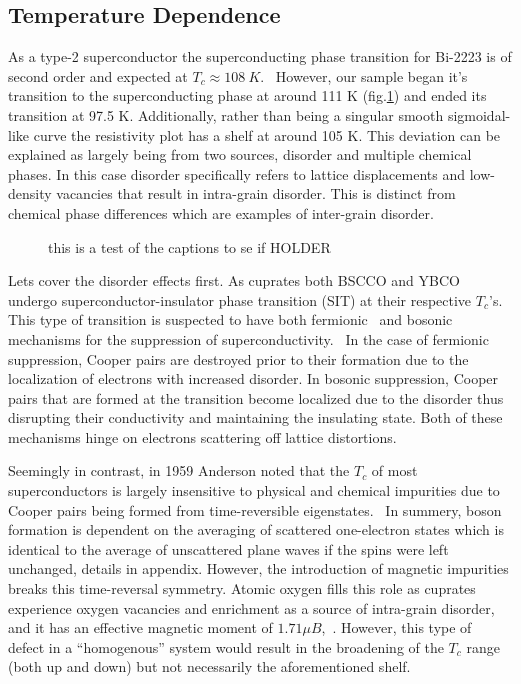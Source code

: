 \documentclass[
reprint,
amsmath,amssymb,
aps,
tikz,
border=5pt
]{revtex4-1}
\begin{document}
  \subsection*{Temperature Dependence}

    As a type-2 superconductor the superconducting phase transition for Bi-2223 is of second order and expected  at $T_c \approx 108~K$.~\cite{bscco_tc} However, our sample began it's transition to the superconducting phase at around 111 K (fig.\ref{fig:bscco_temp}) and ended its transition at 97.5 K. Additionally, rather than being a singular smooth sigmoidal-like curve the resistivity plot has a shelf at around 105 K. This deviation can be explained as largely being from two sources, disorder and multiple chemical phases. In this case disorder specifically refers to lattice displacements and low-density vacancies that result in intra-grain disorder. This is distinct from chemical phase differences which are examples of inter-grain disorder. 
    

    \begin{figure}[t]
      \resizebox{0.45\textwidth}{!}{}
        \caption{this is a test of the captions to se if  HOLDER}
        \label{fig:bscco_temp}
    \end{figure}

    Lets cover the disorder effects first. As cuprates both BSCCO and YBCO undergo superconductor-insulator phase transition (SIT) at their respective $T_c$'s. This type of transition is suspected to have both fermionic~\cite{finkel1994suppression} and bosonic~\cite{fisher1990presence} mechanisms for the suppression of superconductivity.~\cite{Nat_SIT} In the case of fermionic suppression, Cooper pairs are destroyed prior to their formation due to the localization of electrons with increased disorder. In bosonic suppression, Cooper pairs that are formed at the transition become localized due to the disorder thus disrupting their conductivity and maintaining the insulating state. Both of these mechanisms hinge on electrons scattering off lattice distortions.  
    

    Seemingly in contrast, in 1959 Anderson noted that the $T_c$ of most superconductors is largely insensitive to physical and chemical impurities due to Cooper pairs being formed from time-reversible eigenstates.~\cite{anderson1959theory} In summery, boson formation is dependent on the averaging of scattered one-electron states which is identical to the average of unscattered plane waves if the spins were left unchanged, details in appendix. However, the introduction of magnetic impurities breaks this time-reversal symmetry. Atomic oxygen fills this role as cuprates experience oxygen vacancies and enrichment as a source of intra-grain disorder, and it has an effective magnetic moment of $1.71 \mu B$,~\cite{oxygenMag}. However, this type of defect in a ``homogenous'' system would result in the broadening of the $T_c$ range (both up and down) but not necessarily the aforementioned shelf. 
\end{document}
